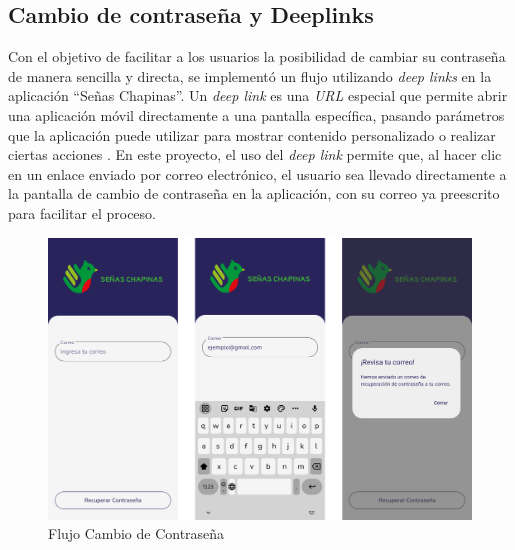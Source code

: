 
\subsection{Cambio de contraseña y Deeplinks}

Con el objetivo de facilitar a los usuarios la posibilidad de cambiar su contraseña de manera sencilla y directa, se implementó un flujo utilizando \textit{deep links} en la aplicación ``Señas Chapinas''. Un \textit{deep link }es una \textit{URL} especial que permite abrir una aplicación móvil directamente a una pantalla específica, pasando parámetros que la aplicación puede utilizar para mostrar contenido personalizado o realizar ciertas acciones \cite{meijomil2024}. En este proyecto, el uso del \textit{deep link} permite que, al hacer clic en un enlace enviado por correo electrónico, el usuario sea llevado directamente a la pantalla de cambio de contraseña en la aplicación, con su correo ya preescrito para facilitar el proceso.

\begin{figure} [H]
    \centering
    \includegraphics[width=0.5\linewidth]{figuras/cambio_contra_flujo.png}
    \caption{Flujo Cambio de Contraseña}
    \label{fig:enter-label}
\end{figure}


